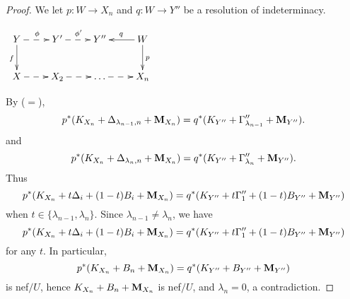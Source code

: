 \documentclass[11pt]{amsart}
\numberwithin{equation}{section}
\newcommand{\Mm}{{\bf{M}}}
\theoremstyle{definition}
\theoremstyle{definition}
\theoremstyle{definition}
\begin{document}
\begin{proof}
We let $p: W\rightarrow X_n$ and $q: W\rightarrow Y''$ be a resolution of indeterminacy. 
\begin{center}$\xymatrix{
Y\ar@{->}[d]_{f}\ar@{-->}[r]^{\phi}& Y'\ar@{-->}[r]^{\phi'} & Y''& W\ar@{->}[d]^{p}\ar@{->}[l]_{q}\\
 X\ar@{-->}[r]& X_2\ar@{-->}[r] & \dots\ar@{-->}[r] & X_n
}$
\end{center}
By \cite[Lemma 3.5(1)]{HL21} ($=$\cite[Version 3, Lemma 3.9(1)]{HL21}),
$$p^*(K_{X_n}+\Delta_{\lambda_{n-1},n}+\Mm_{X_n})=q^*(K_{Y''}+\Gamma''_{\lambda_{n-1}}+\Mm_{Y''}).$$
and
$$p^*(K_{X_n}+\Delta_{\lambda_{n},n}+\Mm_{X_n})=q^*(K_{Y''}+\Gamma''_{\lambda_{n}}+\Mm_{Y''}).$$
Thus
$$p^*(K_{X_n}+t\Delta_i+(1-t)B_i+\Mm_{X_n})=q^*(K_{Y''}+t\Gamma''_1+(1-t)B_{Y''}+\Mm_{Y''})$$
when $t\in\{\lambda_{n-1},\lambda_{n}\}$. Since $\lambda_{n-1}\not=\lambda_n$, we have
$$p^*(K_{X_n}+t\Delta_i+(1-t)B_i+\Mm_{X_n})=q^*(K_{Y''}+t\Gamma''_1+(1-t)B_{Y''}+\Mm_{Y''})$$
for any $t$. In particular,
$$p^*(K_{X_n}+B_n+\Mm_{X_n})=q^*(K_{Y''}+B_{Y''}+\Mm_{Y''})$$
is nef$/U$, hence $K_{X_n}+B_n+\Mm_{X_n}$ is nef$/U$, and $\lambda_n=0$, a contradiction.
\end{proof}
\end{document}
